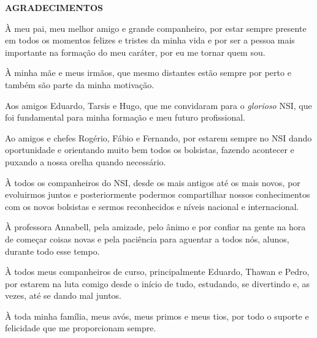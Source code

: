 \begin{center}
\textbf{AGRADECIMENTOS} \\ [2.5cm]
\end{center}

À meu pai, meu melhor amigo e grande companheiro, por estar sempre presente em
todos os momentos felizes e tristes da minha vida e por ser a pessoa mais
importante na formação do meu caráter, por eu me tornar quem sou.

À minha mãe e meus irmãos, que mesmo distantes estão sempre por perto e também
são parte da minha motivação.


Aos amigos Eduardo, Tarsis e Hugo, que me convidaram para o \emph{glorioso} NSI,
que foi fundamental para minha formação e meu futuro profissional.

Ao amigos e chefes Rogério, Fábio e Fernando, por estarem sempre no NSI dando
oportunidade e orientando muito bem todos os bolsistas, fazendo acontecer e
puxando a nossa orelha quando necessário.

À todos os companheiros do NSI, desde os mais antigos até os mais novos, por
evoluirmos juntos e posteriormente podermos compartilhar nossos conhecimentos
com os novos bolsistas e sermos reconhecidos e níveis nacional e internacional.

À professora Annabell, pela amizade, pelo ânimo e por confiar na gente na hora
de começar coisas novas e pela paciência para aguentar a todos nós, alunos, durante
todo esse tempo.

À todos meus companheiros de curso, principalmente Eduardo, Thawan e Pedro, por
estarem na luta comigo desde o início de tudo, estudando, se divertindo e,
as vezes, até se dando mal juntos.

À toda minha família, meus avós, meus primos e meus tios, por todo o suporte e
felicidade que me proporcionam sempre.
